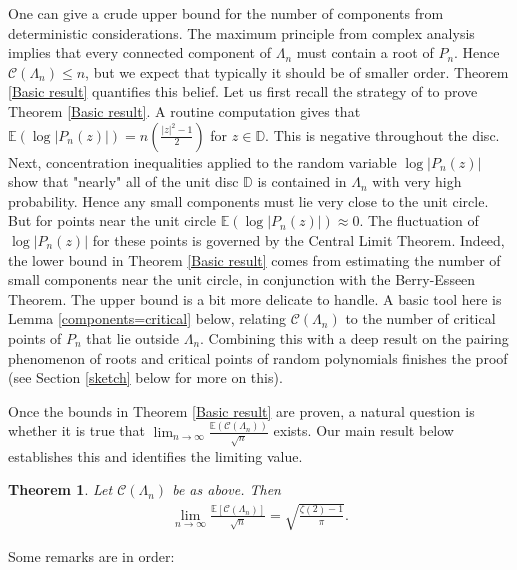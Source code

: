 \documentclass[9pt,a4paper,reqno]{amsart}
\newcommand{\D}{{\mathbb{D}}}
\newcommand{\E}{{\mathbb{E}}}
\theoremstyle{mine}
\newtheorem{thm}{Theorem}[section]
\theoremstyle{definition}
\theoremstyle{remark}
\newcommand{\mb}{\mathbb}
\begin{document}
 One can give a crude upper bound for the number of components from deterministic considerations. The maximum principle from complex analysis implies that every connected component of $\Lambda_n$ must contain a root of $P_n$. Hence $\mathscr{C}(\Lambda_n)\leq n$, but we expect that typically it should be of smaller order. Theorem \ref{Basic result} quantifies this belief. Let us first recall the strategy of \cite{Ghosh-numberofcomponents} to prove Theorem \ref{Basic result}. A routine computation gives that $\E(\log|P_n(z)|) = n\left(\frac{|z|^2 - 1}{2}\right)$ for $z\in \mathbb{D}$. This is negative throughout the disc. Next, concentration inequalities applied to the random variable $\log|P_n(z)|$ show that "nearly" all of the unit disc $\D$ is contained in $\Lambda_n$ with very high probability. Hence any small components must lie very close to the unit circle. But for points near the unit circle $\E(\log|P_n(z)|)\approx 0$. The fluctuation of $\log|P_n(z)|$ for these points is governed by the Central Limit Theorem. Indeed, the lower bound in Theorem \ref{Basic result} comes from estimating the number of small components near the unit circle, in conjunction with the Berry-Esseen Theorem. The upper bound is a bit more delicate to handle. A basic tool here is Lemma \ref{components=critical} below, relating $\mathscr{C}(\Lambda_n)$ to the number of critical points of $P_n$ that lie outside $\Lambda_n$. Combining this with a deep result on the pairing phenomenon of roots and critical points of random polynomials \cite{Kabluchko-Seidel} finishes the proof (see Section \ref{sketch} below for more on this).
 
 
 \vspace{0.1in}
 
 Once the bounds in Theorem \ref{Basic result} are proven, a natural question is whether it is true that $\lim_{n\to\infty}\frac{\E(\mathscr{C}(\Lambda_n))}{\sqrt{n}}$ exists. Our main result below establishes this and identifies the limiting value.
\begin{thm}\label{main-thm}
Let $\mathscr{C}(\Lambda_n)$ be as above. Then 
\begin{align}\label{mainresult}
       \lim_{n \to \infty} \frac{\mb{E}[\mathscr{C}(\Lambda_n)]}{\sqrt{n}} = \sqrt{\frac{\zeta(2) -1}{\pi}}.
    \end{align}
\end{thm}

Some remarks are in order: 
\end{document}
